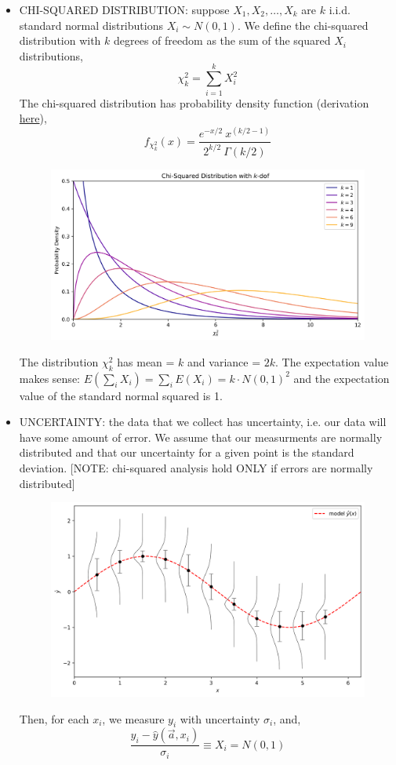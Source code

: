 \documentclass[12pt]{article}
\numberwithin{equation}{section}
\begin{document}
\begin{itemize}
\item CHI-SQUARED DISTRIBUTION: suppose $X_1, X_2, \dots, X_k$ are $k$ i.i.d. standard normal distributions $X_i\sim N(0,1)$. We define the chi-squared distribution with $k$ degrees of freedom as the sum of the squared $X_i$ distributions,
\begin{equation}
	\chi^2_k = \sum_{i=1}^{k} X_i^2
\end{equation}
The chi-squared distribution has probability density function (derivation \href{https://www.ocf.berkeley.edu/~yizhu/static/notes/Chi%20Squared/chi_squared.pdf}{here}),
\begin{equation}
	f_{\chi^2_k}(x) = \frac{e^{-x/2}\ x^{(k/2-1)}}{2^{k/2}\ \Gamma(k/2)} 
\end{equation}
\begin{figure}[H]
	\centering
	\includegraphics[width=11cm] {pdf}
\end{figure}

The distribution $ \chi^2_k $ has mean = $ k $ and variance = $ 2k $. The expectation value makes sense: $ E(\sum_i X_i) = \sum_i E(X_i) = k\cdot N(0,1)^2$ and the expectation value of the standard normal squared is 1.

\item UNCERTAINTY: the data that we collect has uncertainty, i.e. our data will have some amount of error. We assume that our measurments are normally distributed and that our uncertainty for a given point is the standard deviation. [NOTE: chi-squared analysis hold ONLY if errors are normally distributed]
\begin{figure}[H]
	\centering
	\includegraphics[width=11cm] {model}
\end{figure}
Then, for each $ x_i $, we measure $ y_i $ with uncertainty $ \sigma_i $, and,
\begin{equation}
	\frac{y_i - \hat{y}(\vec{a}, x_i) }{\sigma_i} \equiv X_i = N(0,1) 
\end{equation}


\end{itemize}
\end{document}
